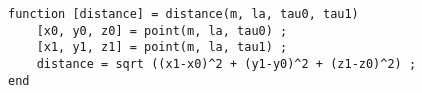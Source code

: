 \begin{verbatim}
function [distance] = distance(m, la, tau0, tau1)
    [x0, y0, z0] = point(m, la, tau0) ;
    [x1, y1, z1] = point(m, la, tau1) ;
    distance = sqrt ((x1-x0)^2 + (y1-y0)^2 + (z1-z0)^2) ;
end
\end{verbatim}